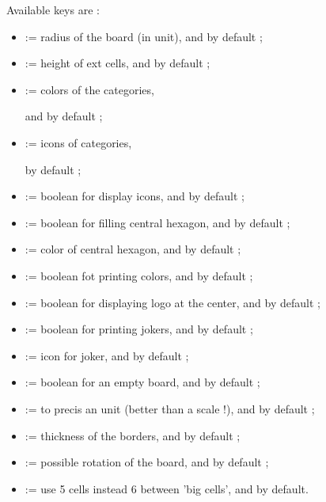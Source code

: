 \documentclass[11pt,a4paper]{ltxdoc}
\begin{document}
Available \textsf{keys} are :

\begin{itemize}
	\item {} := radius of the board (in unit), and  by default ;
	\item {} := height of ext cells, and  by default ;
	\item {} := colors of the categories,
	
	\hfill{}and  by default ;
	\item {} := icons of categories,
	
	\hfill{} by default ;
	\item {} := boolean for display icons, and  by default ;
	\item {} := boolean for filling central hexagon, and  by default ;
	\item {} := color of central hexagon, and  by default ;
	\item {} := boolean fot printing colors, and  by default ;
	\item {} := boolean for displaying logo at the center, and  by default ;
	\item {} := boolean for printing jokers, and  by default ;
	\item {} := icon for joker, and  by default ;
	\item {} := boolean for an empty board, and  by default ;
	\item {} := to precis an unit (better than a scale !), and  by default ;
	\item {} := thickness of the borders, and \MontreCode{0.8pt} by default ;
	\item {} := possible rotation of the board, and  by default ;
	\item {} := use 5 cells instead 6 between 'big cells', and  by default.
\end{itemize}
\end{document}
